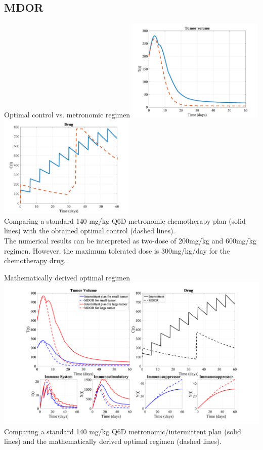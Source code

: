 \documentclass[10pt]{beamer}
\begin{document}
\subsection{MDOR}
\begin{frame}{Optimal control vs. metronomic regimen}
	\includegraphics[width=0.49\textwidth]{chemo-comparison-oc1.jpeg}
	\includegraphics[width=0.49\textwidth]{chemo-comparison-oc2.jpeg} \\
	Comparing a standard 140 mg/kg Q6D metronomic chemotherapy plan (solid lines) with the obtained optimal control (dashed lines). \\ \vspace{0.5cm}
	The numerical results can be interpreted as two-dose of 200mg/kg and 600mg/kg regimen. However, the maximum tolerated dose is 300mg/kg/day for the chemotherapy drug.
\end{frame}

\begin{frame}{Mathematically derived optimal regimen}
	\includegraphics[width=1\textwidth]{chemo-final.png} \\
	Comparing a standard 140 mg/kg Q6D metronomic/intermittent plan (solid lines) and the mathematically derived optimal regimen (dashed lines). 
\end{frame}
\end{document}
